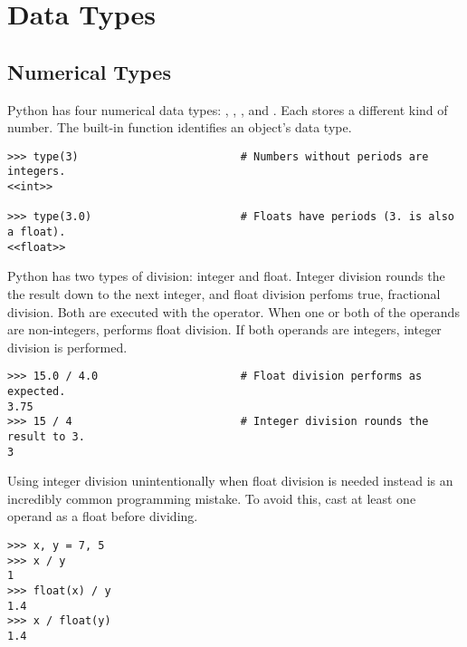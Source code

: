 \section*{Data Types} %

\subsection*{Numerical Types} %
Python has four numerical data types: , , 
, and .
Each stores a different kind of number.
The built-in function  identifies an object's data type.

\begin{lstlisting}
>>> type(3)                         # Numbers without periods are integers.
<<int>>

>>> type(3.0)                       # Floats have periods (3. is also a float).
<<float>>
\end{lstlisting}

Python has two types of division: integer and float.
Integer division rounds the the result down to the next integer, and float division perfoms true, fractional division.
Both are executed  with the \li{/} operator.
When one or both of the operands are non-integers, \li{/} performs float division.
If both operands are integers, integer division is performed.

\begin{lstlisting}
>>> 15.0 / 4.0                      # Float division performs as expected.
3.75
>>> 15 / 4                          # Integer division rounds the result to 3.
3
\end{lstlisting}

\begin{warn} %
Using integer division unintentionally when float division is needed instead is an incredibly common programming mistake.
To avoid this, cast at least one operand as a float before dividing.
\begin{lstlisting}
>>> x, y = 7, 5
>>> x / y
1
>>> float(x) / y
1.4
>>> x / float(y)
1.4
\end{lstlisting}
\end{warn}

